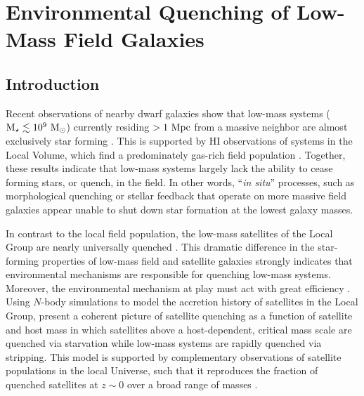 

\chapter{Environmental Quenching of Low-Mass Field Galaxies}



\section{Introduction}
\label{sec:intro} 

Recent observations of nearby dwarf galaxies show that low-mass
systems (${\rm M}_{\star} \lesssim 10^{9}~{\rm M}_{\odot}$) currently residing $>1~{\rm
  Mpc}$ from a massive neighbor are almost exclusively star forming
\citep{mateo98, haines08, weisz11a, geha12}.
%
This is supported by H{\scriptsize I} observations of systems in the Local
Volume, which find a predominately gas-rich field population \citep{spekkens14}.
%
Together, these results indicate that low-mass systems largely lack
the ability to cease forming stars, or quench, in the field. 
%
In other words, ``{\it in situ}'' processes, such as morphological
quenching \citep{martig09} or stellar feedback \citep{larson74, ds86}
that operate on more massive field galaxies appear unable to shut down
star formation at the lowest galaxy masses. 
%




In contrast to the local field population, the low-mass satellites of
the Local Group are nearly universally quenched
\citep[e.g.][]{mateo98, grcevich09, spekkens14}. 
%
This dramatic difference in the star-forming properties of low-mass
field and satellite galaxies strongly indicates that environmental
mechanisms are responsible for quenching low-mass systems. 
Moreover, the environmental mechanism at play must act with great
efficiency \citep[i.e.~rapidly following infall,][]{fham15, wetzel15b}.
%
Using $N$-body simulations to model the accretion history of satellites in the
Local Group, \citet{fham16} present a coherent picture of
satellite quenching as a function of satellite and host mass in which
satellites above a host-dependent, critical mass scale are quenched
via starvation while low-mass systems are rapidly quenched via stripping.
%
This model is supported by complementary observations of satellite populations
in the local Universe, such that it reproduces the fraction of quenched
satellites at $z \sim 0$ over a broad range of masses \citep[e.g.][]{delucia12,
  wetzel13, davies16, stark16}.





